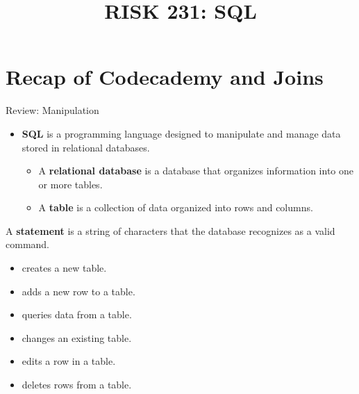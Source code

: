 \documentclass{beamer}
\title{RISK 231: SQL}
\begin{document}
\maketitle

\section{Recap of Codecademy and Joins}

\sectionframe

\begin{frame}{Review: Manipulation}
\begin{itemize}
  \item \textbf{SQL} is a programming language designed to manipulate and manage data
        stored in relational databases.
  \begin{itemize}
    \item A \textbf{relational database} is a database that organizes information into
          one or more tables.
    \item A \textbf{table} is a collection of data organized into rows and columns.
  \end{itemize}
\end{itemize}
\vspace{0.5em}
A \textbf{statement} is a string of characters that the database recognizes as a valid command.
\begin{itemize}
  \item {} creates a new table.
  \item {} adds a new row to a table.
  \item {} queries data from a table.
  \item {} changes an existing table.
  \item {} edits a row in a table.
  \item {} deletes rows from a table.
\end{itemize}
\end{frame}
\end{document}
